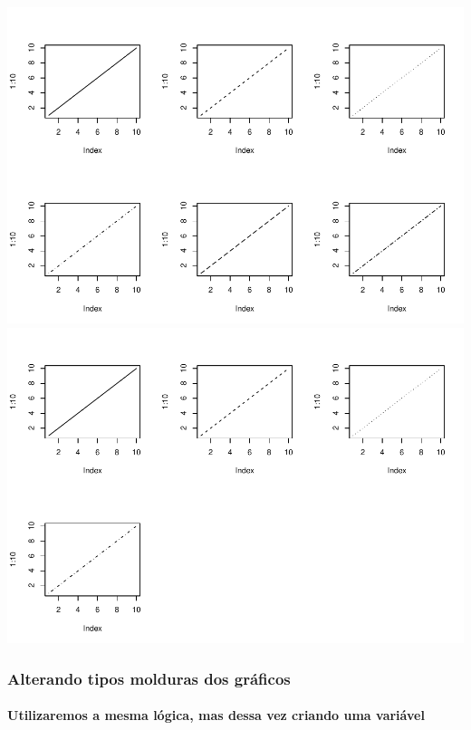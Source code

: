\documentclass[
]{article}
\begin{document}
\includegraphics{presencial_função_plot_04_turma_B_files/figure-latex/unnamed-chunk-9-1.pdf}
\includegraphics{presencial_função_plot_04_turma_B_files/figure-latex/unnamed-chunk-9-2.pdf}

\hypertarget{alterando-tipos-molduras-dos-gruxe1ficos}{%
\subsubsection{Alterando tipos molduras dos
gráficos}\label{alterando-tipos-molduras-dos-gruxe1ficos}}

\hypertarget{utilizaremos-a-mesma-luxf3gica-mas-dessa-vez-criando-uma-variuxe1vel}{%
\paragraph{Utilizaremos a mesma lógica, mas dessa vez criando uma
variável}\label{utilizaremos-a-mesma-luxf3gica-mas-dessa-vez-criando-uma-variuxe1vel}}
\end{document}
